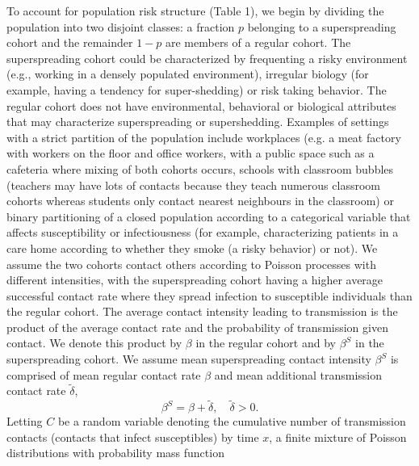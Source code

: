 \documentclass{imammb}
\numberwithin{equation}{section}
\begin{document}
To account for population risk structure (Table 1), we begin by dividing the population into two disjoint classes: a fraction $p$ belonging to a superspreading cohort and the remainder $1-p$ are members of a regular cohort. The superspreading cohort could be characterized by frequenting a risky environment (e.g., working in a densely populated environment), irregular biology (for example, having a tendency for super-shedding) or risk taking behavior. The regular cohort does not have environmental, behavioral or biological attributes that may characterize superspreading or supershedding. Examples of settings with a strict partition of the population  include workplaces (e.g. a meat factory with workers on the floor and office workers, with a public space such as a cafeteria where mixing of both cohorts occurs, schools with classroom bubbles (teachers may have lots of contacts because they teach numerous classroom cohorts whereas students only contact nearest neighbours in the classroom) or binary partitioning of a closed population according to a categorical variable that affects susceptibility or infectiousness (for example, characterizing patients in a care home according to whether they smoke (a risky behavior) or not). We assume the two cohorts contact others according to Poisson processes with different intensities, with the superspreading cohort having a higher average successful contact rate where they spread infection to susceptible individuals than the regular cohort. The average contact intensity leading to transmission is the product of the average contact rate and the probability of transmission given contact. We denote this product by $\beta$ in the regular cohort and by $\beta^S$ in the superspreading cohort. We assume mean superspreading contact intensity $\beta^S $ is comprised of mean regular contact rate $\beta$ and mean additional transmission contact rate $\tilde{\delta}$,
\begin{equation}\label{eqn:R0Adel}
   \beta^S = \beta +\tilde{\delta}, \quad \tilde{\delta} >0.  
\end{equation}
Letting $C$ be a random variable denoting the cumulative number of transmission contacts (contacts that infect susceptibles) by time $x$,  a finite mixture of Poisson distributions with probability mass function %
\end{document}

